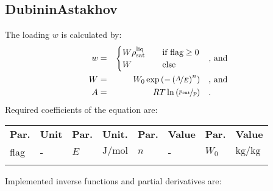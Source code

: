 \subsection{DubininAstakhov}
\label{cha:approaches:ads:vol:da}
%
The loading $w$ is calculated by:
%
\begin{equation*}
	\begin{split}
		w &=& \begin{cases} W \rho_\mathrm{sat}^{\mathrm{liq}} & \quad \text{if flag} \geq 0 \\ W & \quad \text{else} \end{cases} & \quad\text{, and} \\
		W &=& W_0 \exp \left( - \left( \nicefrac{A}{E} \right) ^{n} \right) & \quad\text{, and} \\
		A &=& R T \ln \left( \nicefrac{p_\mathrm{sat}}{p} \right) & \quad\text{.} \\
	\end{split}
\end{equation*}
%
Required coefficients of the equation are:
%
\begin{longtable}[l]{ll|ll|ll|ll}
\toprule
\addlinespace
\textbf{Par.} & \textbf{Unit} & \textbf{Par.} &	\textbf{Unit.} & \textbf{Par.} & \textbf{Value}  & \textbf{Par.} & \textbf{Value} \\
\addlinespace
\midrule
\endhead

\bottomrule
\endfoot
\bottomrule
\endlastfoot
\addlinespace

flag & - & $E$ & $\si{\joule\per\mole}$ & $n$ & - & $W_0$ & $\si{\kilogram\per\kilogram}$ \\

\addlinespace
\end{longtable}
%
Implemented inverse functions and partial derivatives are:
%
